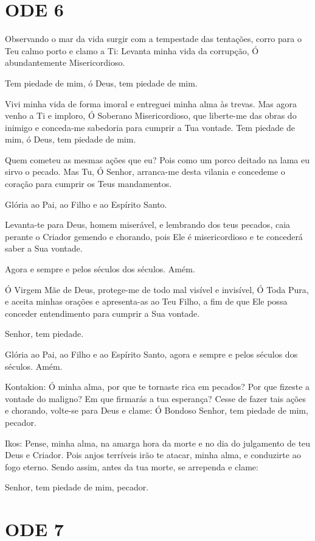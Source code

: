 \documentclass{subfiles}
\begin{document}
\section*{ODE 6}

\eirmos{}Observando o mar da vida surgir com a tempestade das tentações,
corro para o Teu calmo porto e clamo a Ti: Levanta minha vida da corrupção,
Ó abundantemente Misericordioso.

Tem piedade de mim, ó Deus, tem piedade de mim.

Vivi minha vida de forma imoral e entreguei minha alma às trevas. Mas
agora venho a Ti e imploro, Ó Soberano Misericordioso, que liberte-me das
obras do inimigo e conceda-me sabedoria para cumprir a Tua vontade.
Tem piedade de mim, ó Deus, tem piedade de mim.

Quem cometeu as mesmas ações que eu? Pois como um porco deitado na lama eu sirvo
o pecado. Mas Tu, Ó Senhor, arranca-me desta vilania e concedeme o coração para
cumprir os Teus mandamentos.

Glória ao Pai, ao Filho e ao Espírito Santo.

Levanta-te para Deus, homem miserável, e lembrando dos teus pecados, caia
perante o Criador gemendo e chorando, pois Ele é misericordioso e te concederá
saber a Sua vontade.

Agora e sempre e pelos séculos dos séculos. Amém.

Ó Virgem Mãe de Deus, protege-me de todo mal visível e invisível, Ó
Toda Pura, e aceita minhas orações e apresenta-as ao Teu Filho, a fim de que
Ele possa conceder entendimento para cumprir a Sua vontade.

Senhor, tem piedade. 

Glória ao Pai, ao Filho e ao Espírito Santo, agora e sempre e pelos
séculos dos séculos. Amém.

Kontakion: Ó minha alma, por que te tornaste rica em pecados? Por que
fizeste a vontade do maligno? Em que firmarás a tua esperança? Cesse de fazer
tais ações e chorando, volte-se para Deus e clame: Ó Bondoso Senhor, tem
piedade de mim, pecador.

Ikos: Pense, minha alma, na amarga hora da morte e no dia do julgamento de teu
Deus e Criador. Pois anjos terríveis irão te atacar, minha alma, e conduzirte ao
fogo eterno. Sendo assim, antes da tua morte, se arrependa e clame:

Senhor, tem piedade de mim, pecador.

\section*{ODE 7}
\end{document}
